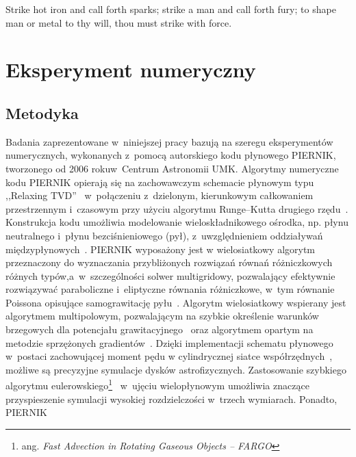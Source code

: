 \begin{savequote}[75mm]
Strike hot iron and call forth sparks; strike a man and call forth fury; to
shape man or metal to thy will, thou must strike with force.

\end{savequote}

\chapter{Eksperyment numeryczny}
\section{Metodyka}
\label{sec:metodyka}
Badania zaprezentowane w~niniejszej pracy bazują na szeregu eksperymentów
numerycznych, wykonanych z~pomocą autorskiego kodu płynowego \textsc{PIERNIK},
tworzonego od 2006 roku\linebreak w~Centrum Astronomii UMK.  Algorytmy numeryczne kodu
\textsc{PIERNIK} opierają się na zachowawczym schemacie płynowym typu ,,Relaxing
TVD''~\cite{jin-xin-95} w~połączeniu z~dzielonym, kierunkowym całkowaniem
przestrzennym i~czasowym przy użyciu algorytmu Runge--Kutta drugiego
rzędu~\cite{2003PASP..115..303T,2003ApJS..149..447P}. Konstrukcja kodu umożliwia
modelowanie wieloskładnikowego oś\-rod\-ka, np. płynu neutralnego i~płynu
bezciśnieniowego (pył), z~uwzględnieniem oddziaływań
międzypłynowych~\cite{piernik1,piernik2}. \textsc{PIERNIK} wyposażony jest w
wielosiatkowy algorytm przeznaczony do wyznaczania przybliżonych rozwiązań
równań różniczkowych różnych typów,\linebreak a~w~szczególności solwer multigridowy,
pozwalający efektywnie rozwiązywać paraboliczne i~eli\-pty\-czne równania
różniczkowe, w~tym równanie Poissona opisujące samograwitację pyłu~\citep{HG00}.
Algorytm wielosiatkowy wspierany jest algorytmem multipolowym, pozwalającym na
szybkie określenie warunków brzegowych dla potencjału grawitacyjnego~\citep{J77}
oraz algorytmem opartym na metodzie sprzężonych gradientów~\cite{pcg}. Dzięki
implementacji schematu płynowego w~postaci zachowującej moment pędu w
cylindrycznej siatce współrzędnych~\cite{M07,SO10}, możliwe są  precyzyjne
symulacje dysków astrofizycznych. Zastosowanie szybkiego algorytmu
eulerowskiego\footnote{ang.  \emph{Fast Advection in Rotating Gaseous Objects
-- FARGO}}~\citep{M00} w~ujęciu wielopłynowym umożliwia znaczące przyspieszenie
symulacji wysokiej rozdzielczości w~trzech wymiarach.  Ponadto, \textsc{PIERNIK}
